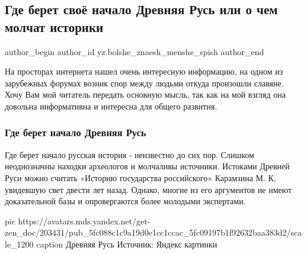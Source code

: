  
 
 
 
 
 
\subsection{Где берет своё начало Древняя Русь или о чем молчат историки}
\label{sec:27_11_2020.sites.ru.zen_yandex.yz.bolshe_znaesh_menshe_spish.1.drevnjaja_rus}
\ifcmt
	author_begin
   author_id yz.bolshe_znaesh_menshe_spish
	author_end
\fi


На просторах интернета нашел очень интересную информацию, на одном из
зарубежных форумах возник спор между людьми откуда произошли славяне. Хочу Вам
мой читатель передать основную мысль, так как на мой взгляд она довольна
информативна и интересна для общего развития.

\subsubsection{Где берет начало Древняя Русь}

Где берет начало русская история - неизвестно до сих пор. Слишком неоднозначны
находки археологов и молчаливы источники. Истоками Древней Руси можно считать
«Историю государства российского» Карамзина М. К, увидевшую свет двести лет
назад. Однако, многие из его аргументов не имеют доказательной базы и
опровергаются более молодыми экспертами.

\ifcmt
pic https://avatars.mds.yandex.net/get-zen_doc/203431/pub_5fc088c1c9a19d0e1cc1ccac_5fc09197b1f92632baa383d2/scale_1200
caption Древняя Русь Источник: Яндекс картинки
\fi

